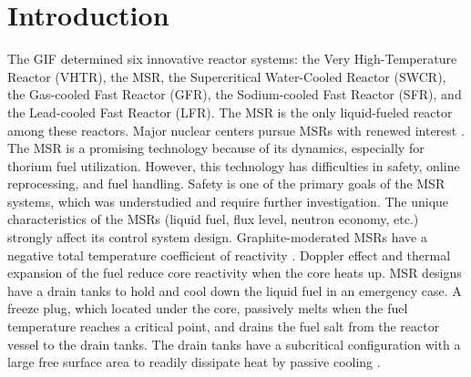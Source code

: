 \section{Introduction} \label{Introduction}

The \gls{GIF} \cite{doe2002technology} determined six innovative reactor 
systems: the Very High-Temperature Reactor (VHTR), the \gls{MSR}, the 
Supercritical Water-Cooled Reactor (SWCR), the Gas-cooled Fast Reactor (GFR), 
the Sodium-cooled Fast Reactor (SFR), and the Lead-cooled Fast Reactor (LFR). 
The MSR is the only liquid-fueled reactor among these reactors. Major nuclear 
centers pursue MSRs with renewed interest \cite{betzler_impacts_2019, 
ashraf2019whole_core,betzler2016modeling,mohsin2019safety,zhang2020radiotoxicity}.
The MSR is a promising technology because of its dynamics, especially for 
thorium fuel utilization. However, this technology has difficulties in safety, 
online reprocessing, and fuel handling. Safety is one of the primary goals of 
the MSR systems, which was understudied and require further investigation. The 
unique characteristics of the MSRs (liquid fuel, flux level, neutron economy, 
etc.) strongly affect its control system design. Graphite-moderated MSRs have 
a negative total temperature coefficient of reactivity 
\cite{ashraf2019whole_core,robertson_conceptual_1971,nuttin2005potential,rykhlevskii2019modeling,li_optimization_2018}.
Doppler effect and thermal expansion of the fuel reduce core reactivity when 
the core heats up. MSR designs have a drain tanks to 
hold and cool down the liquid fuel in an emergency case. A freeze plug, which 
located under the core, passively melts when the fuel temperature reaches a 
critical point, and drains the fuel salt from the reactor vessel to the drain 
tanks. The drain tanks have a subcritical
configuration with a large free 
surface area to readily dissipate heat by passive cooling 
\cite{elsheikh2013safety}.

